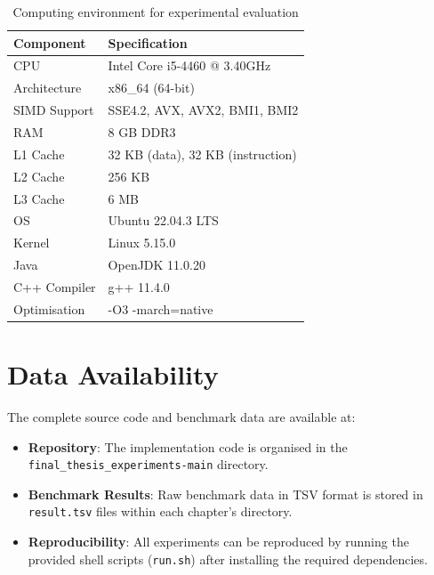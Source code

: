 \begin{table}[H]
\centering
\begin{tabular}{|l|l|}
\hline
\textbf{Component} & \textbf{Specification} \\
\hline
CPU & Intel Core i5-4460 @ 3.40GHz \\
Architecture & x86\_64 (64-bit) \\
SIMD Support & SSE4.2, AVX, AVX2, BMI1, BMI2 \\
RAM & 8 GB DDR3 \\
L1 Cache & 32 KB (data), 32 KB (instruction) \\
L2 Cache & 256 KB \\
L3 Cache & 6 MB \\
\hline
OS & Ubuntu 22.04.3 LTS \\
Kernel & Linux 5.15.0 \\
Java & OpenJDK 11.0.20 \\
C++ Compiler & g++ 11.4.0 \\
Optimisation & -O3 -march=native \\
\hline
\end{tabular}
\caption{Computing environment for experimental evaluation}
\label{tab:environment}
\end{table}

\section{Data Availability}
\label{sec:data}

The complete source code and benchmark data are available at:

\begin{itemize}
    \item \textbf{Repository}: The implementation code is organised in the \texttt{final\_thesis\_experiments-main} directory.

    \item \textbf{Benchmark Results}: Raw benchmark data in TSV format is stored in \texttt{result.tsv} files within each chapter's directory.

    \item \textbf{Reproducibility}: All experiments can be reproduced by running the provided shell scripts (\texttt{run.sh}) after installing the required dependencies.
\end{itemize}
